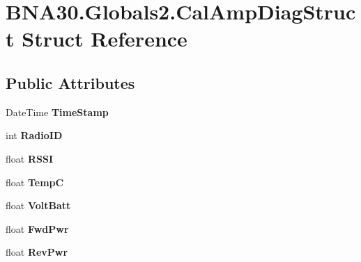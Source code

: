 \hypertarget{struct_b_n_a30_1_1_globals2_1_1_cal_amp_diag_struct}{}\section{B\+N\+A30.\+Globals2.\+Cal\+Amp\+Diag\+Struct Struct Reference}
\label{struct_b_n_a30_1_1_globals2_1_1_cal_amp_diag_struct}
\subsection*{Public Attributes}
\begin{DoxyCompactItemize}
\item 
\mbox{\label{struct_b_n_a30_1_1_globals2_1_1_cal_amp_diag_struct_adf16a41041580c5fab813a1ae37cad9c}} 
Date\+Time {\bfseries Time\+Stamp}
\item 
\mbox{\label{struct_b_n_a30_1_1_globals2_1_1_cal_amp_diag_struct_a0d7b38770a6d380d3012d610ed533498}} 
int {\bfseries Radio\+ID}
\item 
\mbox{\label{struct_b_n_a30_1_1_globals2_1_1_cal_amp_diag_struct_a8116cc2f845abe56f6ea1a5407682756}} 
float {\bfseries R\+S\+SI}
\item 
\mbox{\label{struct_b_n_a30_1_1_globals2_1_1_cal_amp_diag_struct_ac42079ed855b1e66dd665b80bc65bd58}} 
float {\bfseries TempC}
\item 
\mbox{\label{struct_b_n_a30_1_1_globals2_1_1_cal_amp_diag_struct_a40a74dbb9403a2365633958163bb5545}} 
float {\bfseries Volt\+Batt}
\item 
\mbox{\label{struct_b_n_a30_1_1_globals2_1_1_cal_amp_diag_struct_a994486562e9296facb8a31f0d9909ef1}} 
float {\bfseries Fwd\+Pwr}
\item 
\mbox{\label{struct_b_n_a30_1_1_globals2_1_1_cal_amp_diag_struct_a20a34733e237c21b6f32122def0af9c5}} 
float {\bfseries Rev\+Pwr}

\end{DoxyCompactItemize}
